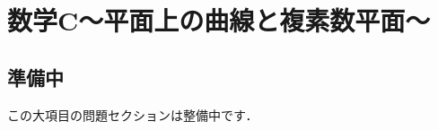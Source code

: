 \documentclass[../../uem_mat_std_q.tex]{subfiles}
\begin{document}
\section{数学C～平面上の曲線と複素数平面～}

\subsection*{準備中}
この大項目の問題セクションは整備中です．
\end{document}
